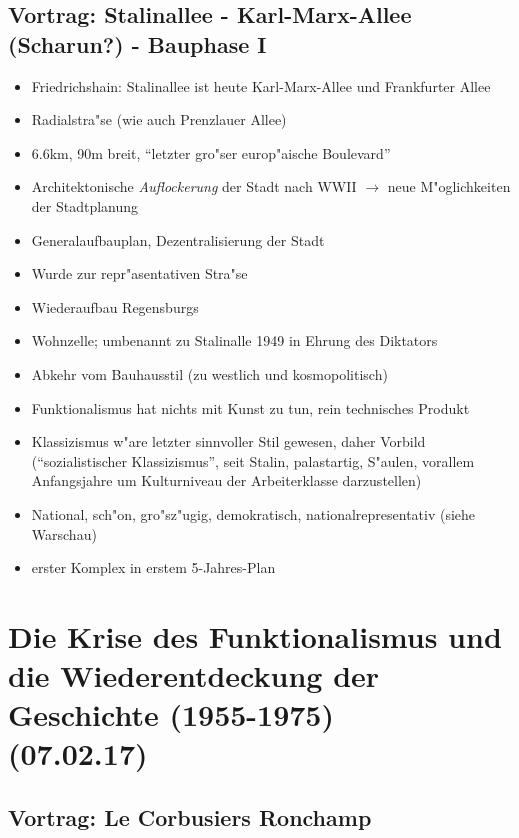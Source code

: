 \documentclass[a5paper]{scrartcl}
\begin{document}
\subsection{Vortrag: Stalinallee - Karl-Marx-Allee (Scharun?) - Bauphase I}

\begin{itemize}
  \item Friedrichshain: Stalinallee ist heute Karl-Marx-Allee und Frankfurter Allee
  \item Radialstra"se (wie auch Prenzlauer Allee)
  \item 6.6km, 90m breit, "`letzter gro"ser europ"aische Boulevard"'
  \item Architektonische \emph{Auflockerung} der Stadt nach WWII $\rightarrow$ neue M"oglichkeiten der Stadtplanung
  \item Generalaufbauplan, Dezentralisierung der Stadt
  \item Wurde zur repr"asentativen Stra"se
  \item Wiederaufbau Regensburgs
  \item Wohnzelle; umbenannt zu Stalinalle 1949 in Ehrung des Diktators
  \item Abkehr vom Bauhausstil (zu westlich und kosmopolitisch)
  \item Funktionalismus hat nichts mit Kunst zu tun, rein technisches Produkt
  \item Klassizismus w"are letzter sinnvoller Stil gewesen, daher Vorbild ("`sozialistischer Klassizismus"', seit Stalin, palastartig, S"aulen, vorallem Anfangsjahre um Kulturniveau der Arbeiterklasse darzustellen)
  \item National, sch"on, gro"sz"ugig, demokratisch, nationalrepresentativ (siehe Warschau)
  \item erster Komplex in erstem 5-Jahres-Plan
\end{itemize}

\section{Die Krise des Funktionalismus und die Wiederentdeckung der Geschichte (1955-1975)\\(07.02.17)}

\subsection{Vortrag: Le Corbusiers Ronchamp}
\end{document}
